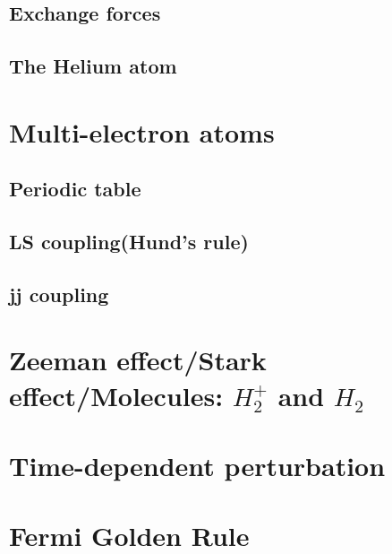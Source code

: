 \documentclass[12pt,a4paper]{article}
\begin{document}
\subsection{Exchange forces}
\subsection{The Helium atom}
\section{Multi-electron atoms}
\subsection{Periodic table}
\subsection{LS coupling(Hund's rule)}
\subsection{jj coupling}
\section{Zeeman effect/Stark effect/Molecules: $H^+_2$ and $H_2$}
\section{Time-dependent perturbation}
\section{Fermi Golden Rule}
\end{document}
